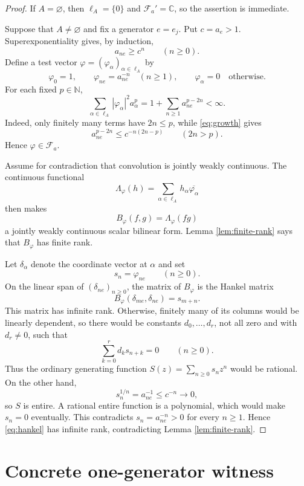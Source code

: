 \documentclass[11pt]{article}
\newcommand{\C}{\mathbb C}
\newcommand{\N}{\mathbb N}
\newcommand{\Fa}{\mathcal F_a}
\begin{document}
\begin{proof}
If $A=\varnothing$, then $\ell_A=\{0\}$ and $\Fa'=\C$, so the assertion is
immediate.

Suppose that $A\ne\varnothing$ and fix a generator $e=e_j$.  Put
$c=a_e>1$.  Superexponentiality gives, by induction,
\begin{equation}\label{eq:growth}
 a_{ne}\ge c^n\qquad(n\ge0).
\end{equation}
Define a test vector $\varphi=(\varphi_\alpha)_{\alpha\in\ell_A}$ by
\[
 \varphi_0=1,\qquad
 \varphi_{ne}=a_{ne}^{-n}\quad(n\ge1),\qquad
 \varphi_\alpha=0\quad\text{otherwise}.
\]
For each fixed $p\in\N$,
\[
 \sum_{\alpha\in\ell_A}|\varphi_\alpha|^2a_\alpha^p
 =1+\sum_{n\ge1}a_{ne}^{p-2n}<\infty.
\]
Indeed, only finitely many terms have $2n\le p$, while \eqref{eq:growth}
gives
\[
 a_{ne}^{p-2n}\le c^{-n(2n-p)}
 \qquad(2n>p).
\]
Hence $\varphi\in\Fa$.

Assume for contradiction that convolution is jointly weakly continuous.
The continuous functional
\[
 \Lambda_\varphi(h)=\sum_{\alpha\in\ell_A}h_\alpha
 \overline{\varphi_\alpha}
\]
then makes
\[
 B_\varphi(f,g)=\Lambda_\varphi(fg)
\]
a jointly weakly continuous scalar bilinear form.  Lemma
\ref{lem:finite-rank} says that $B_\varphi$ has finite rank.

Let $\delta_\alpha$ denote the coordinate vector at $\alpha$ and set
\[
 s_n=\varphi_{ne}\qquad(n\ge0).
\]
On the linear span of $(\delta_{ne})_{n\ge0}$, the matrix of
$B_\varphi$ is the Hankel matrix
\begin{equation}\label{eq:hankel}
 B_\varphi(\delta_{me},\delta_{ne})=s_{m+n}.
\end{equation}
This matrix has infinite rank.  Otherwise, finitely many of its columns would
be linearly dependent, so there would be constants $d_0,\ldots,d_r$, not all
zero and with $d_r\ne0$, such that
\[
 \sum_{k=0}^r d_ks_{n+k}=0\qquad(n\ge0).
\]
Thus the ordinary generating function $S(z)=\sum_{n\ge0}s_nz^n$ would be
rational.  On the other hand,
\[
 s_n^{1/n}=a_{ne}^{-1}\le c^{-n}\longrightarrow0,
\]
so $S$ is entire.  A rational entire function is a polynomial, which would
make $s_n=0$ eventually.  This contradicts $s_n=a_{ne}^{-n}>0$ for every
$n\ge1$.  Hence \eqref{eq:hankel} has infinite rank, contradicting Lemma
\ref{lem:finite-rank}.
\end{proof}

\section{Concrete one-generator witness}
\end{document}
